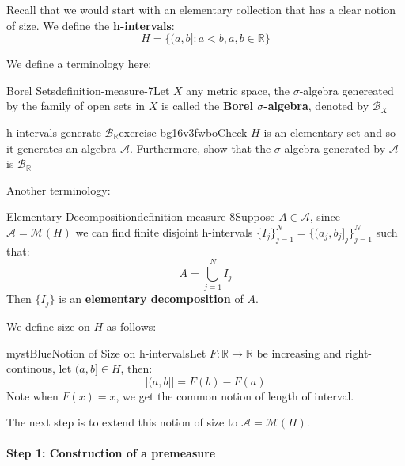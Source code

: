 Recall that we would start with an elementary collection that has a clear notion of size. We define the \textbf{h-intervals}:
\begin{equation}
H=\{(a,b]:a<b, a,b\in \mathbb{R}\}
\end{equation}

We define a terminology here:

\begin{mystthmdefinition}{Borel Sets}{definition-measure-7}Let $X$ any metric space, the $\sigma$-algebra genereated by the family of open sets in $X$ is called the \textbf{Borel $\sigma$-algebra}, denoted by $\mathcal B_{X}$

\end{mystthmdefinition}
\begin{mystexercise}{h-intervals generate $\mathcal B_{\mathbb{R}}$}{exercise-bg16v3fwbo}\label{exercise-bg16V3FwBo}\label{exercise-bg16v3fwbo}Check $H$ is an elementary set and so it generates an algebra $\mathcal A$. Furthermore, show that the $\sigma$-algebra generated by $\mathcal A$ is   $\mathcal B_{\mathbb{R}}$

\end{mystexercise}
Another terminology:

\begin{mystthmdefinition}{Elementary Decomposition}{definition-measure-8}Suppose $A\in \mathcal A$, since $\mathcal A=\mathcal M(H)$ we can find finite disjoint h-intervals $\{I_j\}_{j=1}^N=\{(a_j,b_j]_j\}_{j=1}^N$ such that:
\begin{equation}
A=\bigcup_{j=1}^N I_j
\end{equation}
Then $\{I_j\}$ is an \textbf{elementary decomposition} of $A$.

\end{mystthmdefinition}
We define size on $H$ as follows:

\begin{mystadmonition}{mystBlue}{Notion of Size on h-intervals}Let $F:\mathbb{R}\to\mathbb{R}$ be increasing and right-continous, let $(a,b]\in H$, then:
\begin{equation}
|(a,b]|=F(b)-F(a)
\end{equation}
Note when $F(x)=x$, we get the common notion of length of interval.

\end{mystadmonition}
The next step is to extend this notion of size to $\mathcal A=\mathcal M(H)$.

\paragraph{Step 1: Construction of a premeasure}

